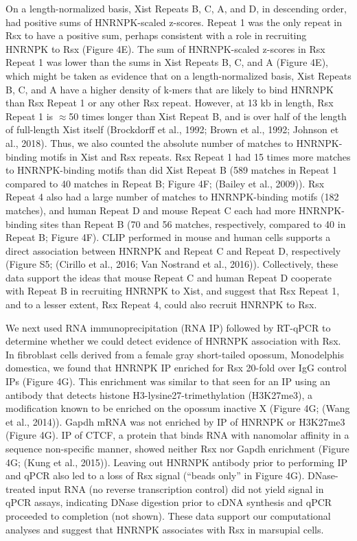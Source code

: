 On a length-normalized basis, Xist Repeats B, C, A, and D, in descending order, had positive sums of HNRNPK-scaled z-scores. Repeat 1 was the only repeat in Rsx to have a positive sum, perhaps consistent with a role in recruiting HNRNPK to Rsx (Figure 4E). The sum of HNRNPK-scaled z-scores in Rsx Repeat 1 was lower than the sums in Xist Repeats B, C, and A (Figure 4E), which might be taken as evidence that on a length-normalized basis, Xist Repeats B, C, and A have a higher density of k-mers that are likely to bind HNRNPK than Rsx Repeat 1 or any other Rsx repeat. However, at 13 kb in length, Rsx Repeat 1 is $\approx$50 times longer than Xist Repeat B, and is over half of the length of full-length Xist itself (Brockdorff et al., 1992; Brown et al., 1992; Johnson et al., 2018). Thus, we also counted the absolute number of matches to HNRNPK-binding motifs in Xist and Rsx repeats. Rsx Repeat 1 had 15 times more matches to HNRNPK-binding motifs than did Xist Repeat B (589 matches in Repeat 1 compared to 40 matches in Repeat B; Figure 4F; (Bailey et al., 2009)). Rsx Repeat 4 also had a large number of matches to HNRNPK-binding motifs (182 matches), and human Repeat D and mouse Repeat C each had more HNRNPK-binding sites than Repeat B (70 and 56 matches, respectively, compared to 40 in Repeat B; Figure 4F). CLIP performed in mouse and human cells supports a direct association between HNRNPK and Repeat C and Repeat D, respectively (Figure S5; (Cirillo et al., 2016; Van Nostrand et al., 2016)). Collectively, these data support the ideas that mouse Repeat C and human Repeat D cooperate with Repeat B in recruiting HNRNPK to Xist, and suggest that Rsx Repeat 1, and to a lesser extent, Rsx Repeat 4, could also recruit HNRNPK to Rsx. 

We next used RNA immunoprecipitation (RNA IP) followed by RT-qPCR to determine whether we could detect evidence of HNRNPK association with Rsx. In fibroblast cells derived from a female gray short-tailed opossum, Monodelphis domestica, we found that HNRNPK IP enriched for Rsx 20-fold over IgG control IPs (Figure 4G). This enrichment was similar to that seen for an IP using an antibody that detects histone H3-lysine27-trimethylation (H3K27me3), a modification known to be enriched on the opossum inactive X (Figure 4G; (Wang et al., 2014)). Gapdh mRNA was not enriched by IP of HNRNPK or H3K27me3 (Figure 4G). IP of CTCF, a protein that binds RNA with nanomolar affinity in a sequence non-specific manner, showed neither Rsx nor Gapdh enrichment (Figure 4G; (Kung et al., 2015)). Leaving out HNRNPK antibody prior to performing IP and qPCR also led to a loss of Rsx signal (“beads only” in Figure 4G). DNase-treated input RNA (no reverse transcription control) did not yield signal in qPCR assays, indicating DNase digestion prior to cDNA synthesis and qPCR proceeded to completion (not shown). These data support our computational analyses and suggest that HNRNPK associates with Rsx in marsupial cells.

